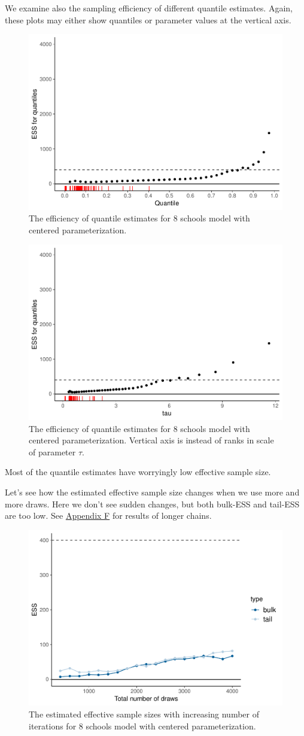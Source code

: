 \documentclass[american,]{article}
\begin{document}
We examine also the sampling efficiency of different quantile estimates.
Again, these plots may either show quantiles or parameter values at the
vertical axis.

\begin{figure}[tp]
  \centering
  \includegraphics[width=0.6\linewidth]{graphics/quantile-ess-fit-cp-1.pdf}
  \caption{The efficiency of quantile estimates for 8 schools model with centered parameterization.}
\end{figure}

\begin{figure}[tp]
  \centering
  \includegraphics[width=0.6\linewidth]{graphics/quantile-ess-fit-cp-norank-1.pdf}
  \caption{The efficiency of quantile estimates for 8 schools model with centered parameterization. Vertical axis is instead of ranks in scale of parameter $\tau$.}
\end{figure}

Most of the quantile estimates have worryingly low effective sample
size.

Let's see how the estimated effective sample size changes when we use
more and more draws. Here we don't see sudden changes, but both bulk-ESS
and tail-ESS are too low. See \protect\hyperlink{AppendixF}{Appendix F}
for results of longer chains.

\begin{figure}[tp]
  \centering
  \includegraphics[width=0.6\linewidth]{graphics/change-ess-fit-cp-1.pdf}
  \caption{The estimated effective sample sizes with increasing number of iterations for 8 schools model with centered parameterization.}
\end{figure}
\end{document}
